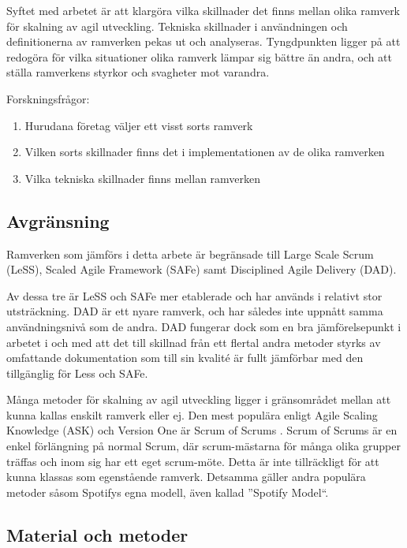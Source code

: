 		Syftet med arbetet är att klargöra vilka skillnader det finns mellan olika ramverk för skalning av agil utveckling. Tekniska skillnader i användningen och definitionerna av ramverken pekas ut och analyseras.
		Tyngdpunkten ligger på att redogöra för vilka situationer olika ramverk lämpar sig bättre än andra, och att ställa ramverkens styrkor och svagheter mot varandra. \newline
		
		
		Forskningsfrågor:
		\begin{enumerate}
			\item Hurudana företag väljer ett visst sorts ramverk
			\item Vilken sorts skillnader finns det i implementationen av de olika ramverken
			\item Vilka tekniska skillnader finns mellan ramverken
		\end{enumerate}
			
	
	\subsection{Avgränsning}
	
		Ramverken som jämförs i detta arbete är begränsade till Large Scale Scrum (LeSS), Scaled Agile Framework (SAFe) samt Disciplined Agile Delivery (DAD).
		
		Av dessa tre är LeSS och SAFe mer etablerade och har används i relativt stor utsträckning. DAD är ett nyare ramverk, och har således inte uppnått samma användningsnivå som de andra. DAD fungerar dock som en bra jämförelsepunkt i arbetet i och med att det till skillnad från ett flertal andra metoder styrks av omfattande dokumentation som till sin kvalité är fullt jämförbar med den tillgänglig för Less och SAFe.
		\cite{ask_matrix}
		
		Många metoder för skalning av agil utveckling ligger i gränsområdet mellan att kunna kallas enskilt ramverk eller ej. Den mest populära enligt Agile Scaling Knowledge (ASK) och Version One är Scrum of Scrums \cite{ask_matrix} \cite{version_one_report}. Scrum of Scrums är en enkel förlängning på normal Scrum, där scrum-mästarna för många olika grupper träffas och inom sig har ett eget scrum-möte. Detta är inte tillräckligt för att kunna klassas som egenstående ramverk. Detsamma gäller andra populära metoder såsom Spotifys egna modell, även kallad ''Spotify Model``.
		
	\subsection{Material och metoder}
		

